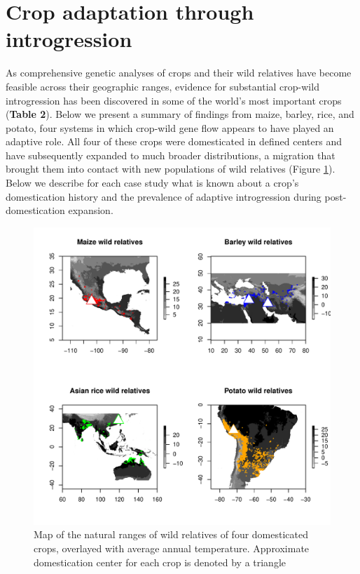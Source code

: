 \documentclass[11pt]{article}
\begin{document}
\section*{Crop adaptation through introgression}

As comprehensive genetic analyses of crops and their wild relatives have become feasible across their geographic ranges, evidence for substantial crop-wild introgression has been discovered in some of the world's most important crops (\textbf{Table 2}).
Below we present a summary of findings from maize, barley, rice, and potato, four systems in which crop-wild gene flow appears to have played an adaptive role.
All four of these crops were domesticated in defined centers and have subsequently expanded to much broader distributions, a migration that brought them into contact with new populations of wild relatives (Figure \ref{fig:map}).
Below we describe for each case study what is known about a crop's domestication history and the prevalence of adaptive introgression during post-domestication  expansion.

\begin{figure}[h]
	\centering
	\includegraphics[width=15cm]{temperature_plot_degC.pdf}
	\caption{Map of the natural ranges of wild relatives of four domesticated crops, overlayed with average annual temperature. Approximate domestication center for each crop is denoted by a triangle}
	\label{fig:map}
\end{figure}
\end{document}
